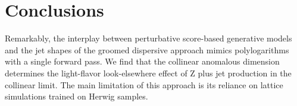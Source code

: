 \section{Conclusions}\label{sec:conclusions}

Remarkably, the interplay between perturbative score-based generative
models and the jet shapes of the groomed dispersive approach mimics
polylogarithms with a single forward pass. We find that the collinear
anomalous dimension determines the light-flavor look-elsewhere effect of
Z plus jet production in the collinear limit. The main limitation of
this approach is its reliance on lattice simulations trained on Herwig
samples.

